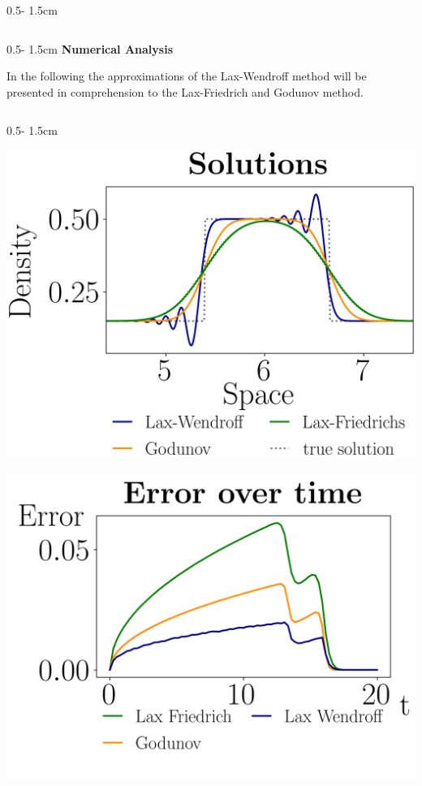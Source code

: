 \documentclass{uibposter}
\begin{document}
\begin{frame}[fragile]
\begin{columns}
\begin{column}{0.5\textwidth - 1.5cm}
\begin{column}{0.5\textwidth - 1.5cm}
\vspace{0.5cm}
\textbf{Numerical Analysis}
\vspace{0.5cm}
    
In the following the approximations of the Lax-Wendroff method will be presented in comprehension to the Lax-Friedrich and Godunov method.
    
\end{column}
\begin{column}{0.5\textwidth - 1.5cm}
\vspace*{-14.5cm}

    \vspace{1.5cm}
    
    \includegraphics{fig/linear_compare.png}
    
    \includegraphics{fig/error_over_time.png}
    

\end{column}
\end{column}
\end{columns}
\end{frame}
\end{document}
